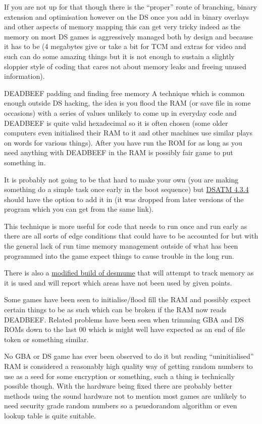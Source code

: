 \documentclass[
]{book}
\begin{document}
If you are not up for that though there is the ``proper'' route of branching, binary extension and optimisation however on the DS once you add in binary overlays and other aspects of memory mapping this can get very tricky indeed as the memory on most DS games is aggressively managed both by design and because it has to be (4 megabytes give or take a bit for TCM and extras for video and such can do some amazing things but it is not enough to sustain a slightly sloppier style of coding that cares not about memory leaks and freeing unused information).

DEADBEEF padding and finding free memory A technique which is common enough outside DS hacking, the idea is you flood the RAM (or save file in some occasions) with a series of values unlikely to come up in everyday code and DEADBEEF is quite valid hexadecimal so it is often chosen (some older computers even initialised their RAM to it and other machines use similar plays on words for various things). After you have run the ROM for as long as you need anything with DEADBEEF in the RAM is possibly fair game to put something in.

It is probably not going to be that hard to make your own (you are making something do a simple task once early in the boot sequence) but \href{http://filetrip.net/nds-downloads/utilities/download-dsatm-434-f27609.html\%20}{DSATM 4.3.4} should have the option to add it in (it was dropped from later versions of the program which you can get from the same link).

This technique is more useful for code that needs to run once and run early as there are all sorts of edge conditions that could have to be accounted for but with the general lack of run time memory management outside of what has been programmed into the game expect things to cause trouble in the long run.

There is also a \href{http://gbatemp.net/threads/unofficial-desmume-build-unused-memory-finder-tool.349332/}{modified build of desmume} that will attempt to track memory as it is used and will report which areas have not been used by given points.

Some games have been seen to initialise/flood fill the RAM and possibly expect certain things to be as such which can be broken if the RAM now reads DEADBEEF. Related problems have been seen when trimming GBA and DS ROMs down to the last 00 which is might well have expected as an end of file token or something similar.

No GBA or DS game has ever been observed to do it but reading ``uninitialised'' RAM is considered a reasonably high quality way of getting random numbers to use as a seed for some encryption or something, such a thing is technically possible though. With the hardware being fixed there are probably better methods using the sound hardware not to mention most games are unlikely to need security grade random numbers so a psuedorandom algorithm or even lookup table is quite suitable.
\end{document}
